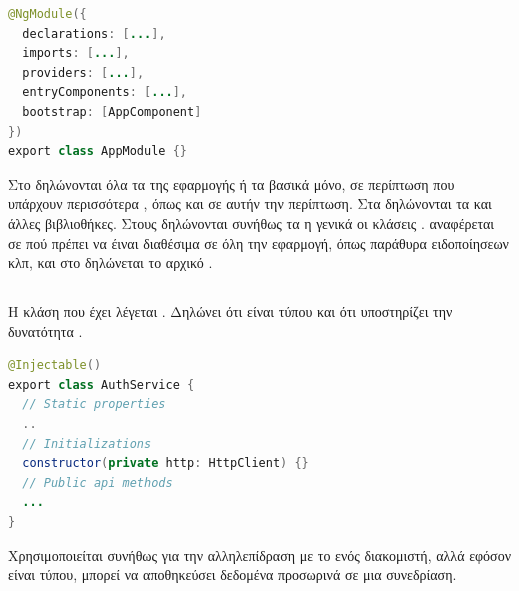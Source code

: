 	\begin{lstlisting}[language=Java]
@NgModule({
  declarations: [...],
  imports: [...],
  providers: [...],
  entryComponents: [...],
  bootstrap: [AppComponent]
})
export class AppModule {}
	\end{lstlisting}


\pSpace Στο  δηλώνονται όλα τα  της εφαρμογής ή τα βασικά μόνο, σε περίπτωση που υπάρχουν περισσότερα , όπως και σε αυτήν την περίπτωση. Στα  δηλώνονται τα  και άλλες βιβλιοθήκες. Στους  δηλώνονται συνήθως τα  η γενικά οι κλάσεις .  αναφέρεται σε  πού πρέπει να έιναι διαθέσιμα σε όλη την εφαρμογή, όπως παράθυρα ειδοποίησεων κλπ, και στο  δηλώνεται το αρχικό .

\subsection*{}
\pSpace Η κλάση που έχει  λέγεται . Δηλώνει ότι είναι τύπου  και ότι υποστηρίζει την δυνατότητα .\\

	\begin{lstlisting}[language=Java]
@Injectable()
export class AuthService {
  // Static properties
  ..
  // Initializations
  constructor(private http: HttpClient) {}
  // Public api methods
  ...
}
	\end{lstlisting}

\pSpace Χρησιμοποιείται συνήθως για την αλληλεπίδραση με το  ενός διακομιστή, αλλά εφόσον είναι  τύπου, μπορεί να αποθηκεύσει δεδομένα προσωρινά σε μια συνεδρίαση.
